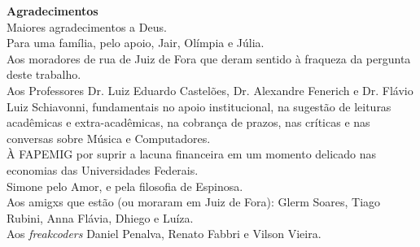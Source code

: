 \newpage
\begin{flushright}
\huge{\textbf{Agradecimentos}}
\ \\
\small{Maiores agradecimentos a Deus.  
\ \\
Para uma família, pelo apoio, Jair, Olímpia e Júlia. 
\ \\
Aos moradores de rua de Juiz de Fora que deram sentido à fraqueza da pergunta deste trabalho.
\ \\
Aos Professores Dr. Luiz Eduardo Castelões, Dr. Alexandre Fenerich e Dr. Flávio Luiz Schiavonni, fundamentais no apoio institucional, na sugestão de leituras acadêmicas e extra-acadêmicas, na cobrança de prazos, nas críticas e nas conversas sobre Música e Computadores.
\ \\
À FAPEMIG por suprir a lacuna financeira em um momento delicado nas economias das Universidades Federais.
\\
Simone pelo Amor, e pela filosofia de Espinosa.
\ \\
Aos amigxs que estão (ou moraram em Juiz de Fora): Glerm Soares, Tiago Rubini, Anna Flávia, Dhiego e Luíza.
\ \\
Aos \emph{freakcoders} Daniel Penalva, Renato Fabbri e Vilson Vieira. }
\end{flushright}

\newpage